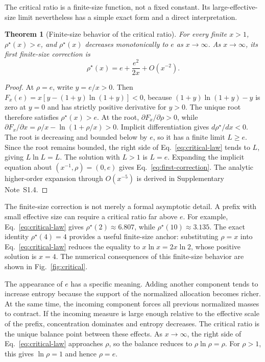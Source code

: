 \documentclass[aip,cha,reprint,superscriptaddress,floatfix]{revtex4-2}
\newtheorem{theorem}{Theorem}
\theoremstyle{definition}
\theoremstyle{remark}
\newcommand{\rhostar}{\rho^{\star}}
\begin{document}
The critical ratio is a finite-size function, not a fixed constant. Its large-effective-size limit nevertheless has a simple exact form and a direct interpretation.

\begin{theorem}[Finite-size behavior of the critical ratio]
\label{thm:finite-size}
For every finite \(x>1\), \(\rhostar(x)>e\), and \(\rhostar(x)\) decreases monotonically to \(e\) as \(x\to\infty\). As \(x\to\infty\), its first finite-size correction is
\begin{equation}
\rhostar(x)=e+\frac{e^2}{2x}+O(x^{-2}).
\label{eq:first-correction}
\end{equation}
\end{theorem}

\begin{proof}
At \(\rho=e\), write \(y=e/x>0\). Then \(F_x(e)=x[y-(1+y)\ln(1+y)]<0\), because \((1+y)\ln(1+y)-y\) is zero at \(y=0\) and has strictly positive derivative for \(y>0\). The unique root therefore satisfies \(\rhostar(x)>e\). At the root, \(\partial F_x/\partial\rho>0\), while \(\partial F_x/\partial x=\rho/x-\ln(1+\rho/x)>0\). Implicit differentiation gives \(d\rhostar/dx<0\). The root is decreasing and bounded below by \(e\), so it has a finite limit \(L\ge e\). Since the root remains bounded, the right side of Eq.~\eqref{eq:critical-law} tends to \(L\), giving \(L\ln L=L\). The solution with \(L>1\) is \(L=e\). Expanding the implicit equation about \((x^{-1},\rho)=(0,e)\) gives Eq.~\eqref{eq:first-correction}. The analytic higher-order expansion through \(O(x^{-5})\) is derived in Supplementary Note~S1.4.
\end{proof}

The finite-size correction is not merely a formal asymptotic detail. A prefix with small effective size can require a critical ratio far above \(e\). For example, Eq.~\eqref{eq:critical-law} gives \(\rhostar(2)\approx6.807\), while \(\rhostar(10)\approx3.135\). The exact identity \(\rhostar(4)=4\) provides a useful finite-size anchor: substituting \(\rho=x\) into Eq.~\eqref{eq:critical-law} reduces the equality to \(x\ln x=2x\ln2\), whose positive solution is \(x=4\). The numerical consequences of this finite-size behavior are shown in Fig.~\ref{fig:critical}.

The appearance of \(e\) has a specific meaning. Adding another component tends to increase entropy because the support of the normalized allocation becomes richer. At the same time, the incoming component forces all previous normalized masses to contract. If the incoming measure is large enough relative to the effective scale of the prefix, concentration dominates and entropy decreases. The critical ratio is the unique balance point between these effects. As \(x\to\infty\), the right side of Eq.~\eqref{eq:critical-law} approaches \(\rho\), so the balance reduces to \(\rho\ln\rho=\rho\). For \(\rho>1\), this gives \(\ln\rho=1\) and hence \(\rho=e\).
\end{document}
